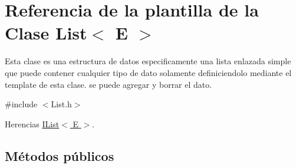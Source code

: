 \hypertarget{classList}{\section{Referencia de la plantilla de la Clase List$<$ E $>$}
\label{classList}
}


Esta clase es una estructura de datos especificamente una lista enlazada simple que puede contener cualquier tipo de dato solamente definiciendolo mediante el template de esta clase. se puede agregar y borrar el dato.  




{\ttfamily \#include $<$List.\-h$>$}



Herencias \hyperlink{classIList}{I\-List$<$ E $>$}.

\subsection*{Métodos públicos}
